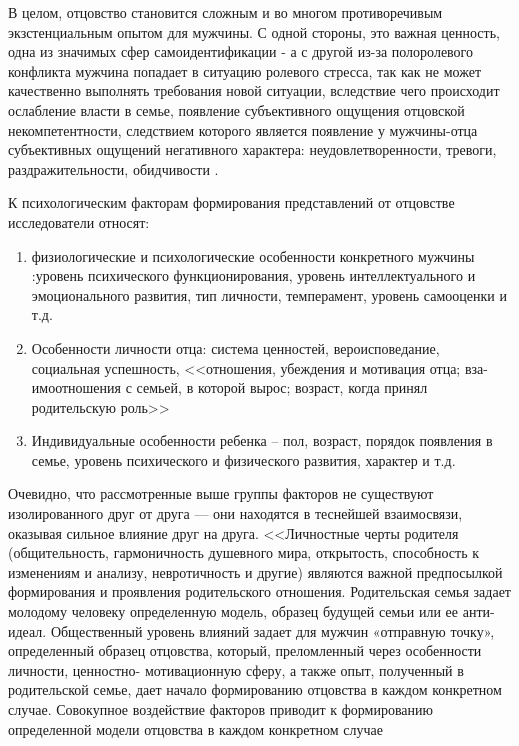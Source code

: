 \documentclass{../../common/thesisbyxetex}
\begin{document}
В целом, отцовство становится сложным и во многом противоречивым экзстенциальным опытом для
мужчины.
 С одной стороны, это важная ценность, одна из
значимых сфер самоидентификации - а с другой из-за полоролевого конфликта  мужчина попадает в
ситуацию ролевого стресса, так как не может
качественно выполнять требования новой ситуации, вследствие чего происходит
ослабление власти в семье, появление субъективного ощущения отцовской
некомпетентности, следствием которого является появление у мужчины-отца
субъективных ощущений негативного характера: неудовлетворенности, тревоги,
раздражительности, обидчивости \cite[111]{confl}.


К психологическим факторам формирования представлений от отцовстве исследователи относят:

\begin{enumerate}
\item  физиологические и психологические особенности конкретного мужчины :уровень психического
функционирования,
уровень интеллектуального и эмоционального развития, тип личности, темперамент, уровень самооценки
и т.д.

\item Особенности личности отца: система ценностей, вероисповедание, социальная
успешность, <<отношения, убеждения и мотивация отца; вза-
имоотношения с семьей, в которой вырос; возраст,
когда принял родительскую роль>> \cite[40]{otage}

\item Индивидуальные особенности ребенка -- пол, возраст, порядок появления в семье, уровень
психического и физического развития, характер и т.д.

\end{enumerate}



Очевидно, что рассмотренные выше группы факторов не существуют изолированного друг от друга --- они
находятся в теснейшей взаимосвязи, оказывая сильное влияние друг на друга. <<Личностные черты
родителя
(общительность, гармоничность душевного мира, открытость, способность к
изменениям и анализу, невротичность и другие) являются важной предпосылкой
формирования и проявления родительского отношения. Родительская семья задает
молодому человеку определенную модель, образец будущей семьи или ее анти-идеал.
Общественный уровень влияний задает для мужчин «отправную точку», определенный
образец отцовства, который, преломленный через особенности личности, ценностно-
мотивационную сферу, а также опыт, полученный в родительской семье, дает начало
формированию отцовства в каждом конкретном случае. Совокупное воздействие
факторов приводит к формированию определенной модели отцовства в каждом
конкретном случае \cite[122]{har}
\end{document}
